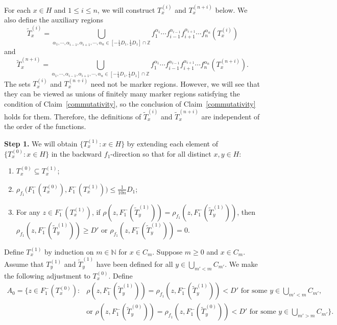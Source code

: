 \documentclass[11pt, reqno, a4paper]{amsart}
\theoremstyle{definition}
\theoremstyle{plain}
\begin{document}
 For each $x\in H$ and $1\leq i\leq n$, we will construct $T_x^{(i)}$ and $T_x^{(n+i)}$ below.  We also define the auxiliary regions
  $$
 \widetilde T_x^{(i)}=\bigcup _{  \alpha_1,\cdots, \alpha_{i-1}, \alpha_{i+1},\cdots , \alpha_n \in \left[-\frac{1}{4}D_1,\frac{1}{4}D_1\right]\cap\mathbb{Z}}f_1^{\alpha_1}\cdots f_{i-1}^{\alpha_{i-1}} f_{i+1}^{\alpha_{i+1}}\cdots f_n^{\alpha_n}(T_x^{(i)})
 $$
 and 
 $$
 \widetilde T_x^{(n+i)}=\bigcup _{\alpha_1,\cdots, \alpha_{i-1}, \alpha_{i+1},\cdots , \alpha_n \in \left[-\frac{1}{4}D_1,\frac{1}{4}D_1\right]\cap\mathbb{Z}}f_1^{\alpha_1}\cdots f_{i-1}^{\alpha_{i-1}} f_{i+1}^{\alpha_{i+1}}\cdots f_n^{\alpha_n}(T_x^{(n+i)}).
$$
The
sets $T_x^{(i)}$ and $T_x^{(n+i)}$ need not be marker regions. However, we will see that they can be viewed as unions of finitely many marker regions satisfying the condition of Claim~\ref{commutativity}, so the conclusion of Claim~\ref{commutativity} holds for them. Therefore, the definitions of
$\widetilde T_x^{(i)}$ and $\widetilde T_x^{(n+i)}$
are independent of the order of the functions.


\vspace{1em}
\noindent\textbf{Step 1.}
We will obtain $\{T_x^{(1)}:x\in H\}$ by extending each element of $\{T_x^{(0)}:x\in H\}$ in the backward $f_1$-direction so that
for all distinct $x,y\in H$:

\begin{enumerate}[label=(1.\arabic*),leftmargin=3.2em]
\item $T_x^{(0)}\subseteq T_x^{(1)}$;
\item $\rho_{f_1}\!\bigl(F_1^-(T_x^{(0)}),F_1^-(T_x^{(1)})\bigr)\le \frac{1}{10n}D_1$;
\item For any $z\in F_1^-(T_x^{(1)})$, if $\rho(z, F_1^-(\widetilde T_y^{(1)}))=\rho_{f_1}(z, F_1^-(\widetilde T_y^{(1)}))$, then $\rho_{f_1}(z, F_1^-(\widetilde T_y^{(1)}))\ge D'$ or $\rho_{f_1}(z, F_1^-(\widetilde T_y^{(1)}))=0$.
\end{enumerate}

Define $T_x^{(1)}$ by induction on $m\in\mathbb{N}$ for $x\in C_m$. 
Suppose $m\geq 0$ and $x\in C_m$. Assume that $T_y^{(1)}$ and $\widetilde T_y^{(1)}$ have been defined for all $y\in\bigcup_{m'<m}C_{m'}$. 
We make the following adjustment to $T_x^{(0)}$. Define 
$$
\begin{aligned}
A_0=\Big\{z\in F_1^-(T_x^{(0)})\colon  
& \rho(z, F_1^-(\widetilde T_y^{(1)}))=
\rho_{f_1}(z, F_1^-(\widetilde T_y^{(1)}))<D' \text{ for some } y \in \bigcup_{m'<m}C_{m'}, \\
&\mbox{or } \rho(z, F_1^-(\widetilde T_y^{(0)}))=
\rho_{f_1}(z, F_1^-(\widetilde T_y^{(0)}))<D' \text{ for some } y \in \bigcup_{m'>m}C_{m'}\Big\}.
\end{aligned}
$$
\end{document}
